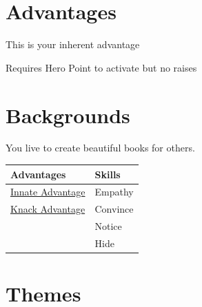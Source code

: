     \section{Advantages}
    \hypertarget{a:innateadvantage}{}
    This is your inherent advantage
    
    \hypertarget{a:knackadvantage}{}
    Requires Hero Point to activate but no raises
    
    \section{Backgrounds}
    \noindent You live to create beautiful books for others.
    

    
    \begin{table}[h]
        \centering
        \renewcommand{\arraystretch}{1.2} %
        \begin{tabular}{p{} p{}} %
            \textbf{Advantages} & \textbf{Skills} \\
            \hline
            \hyperlink{a:innateadvantage}{Innate Advantage} & Empathy \\
            \hyperlink{a:knackadvantage}{Knack Advantage} & Convince \\
            & Notice \\
            & Hide \\
            \hline
        \end{tabular}
    \end{table}
    

	\newpage
    
    \section{Themes}
    








    
        

